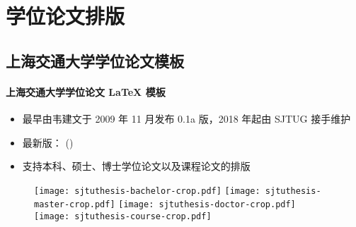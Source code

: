 

\section{学位论文排版}
\subsection{\SJTUThesis 上海交通大学学位论文模板}

\begin{frame}{\SJTUThesis}
  \framesubtitle{上海交通大学学位论文 \LaTeX{} 模板}
  \begin{itemize}
    \item 最早由韦建文于 2009 年 11 月发布 0.1a 版，2018 年起由 SJTUG 接手维护
    \item 最新版：\SJTUThesisVersion{} (\SJTUThesisDate)
    \item 支持本科、硕士、博士学位论文以及课程论文的排版
  \end{itemize}
  \begin{figure}[htbp]
    \centering
    \texttt{[image: sjtuthesis-bachelor-crop.pdf]}\hspace{6pt}
    \texttt{[image: sjtuthesis-master-crop.pdf]}\hspace{6pt}
    \texttt{[image: sjtuthesis-doctor-crop.pdf]}\hspace{6pt}
    \texttt{[image: sjtuthesis-course-crop.pdf]}
  \end{figure}
\end{frame}


